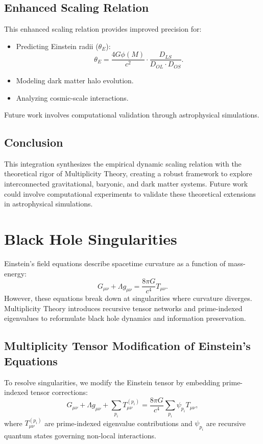 \documentclass[12]{amsart}
\theoremstyle{plain}
\begin{document}
\subsection{Enhanced Scaling Relation}
This enhanced scaling relation provides improved precision for:
\begin{itemize}
    \item Predicting Einstein radii ($\theta_E$):
    \begin{equation}
        \theta_E = \frac{4G \phi(M)}{c^2} \cdot \frac{D_{LS}}{D_{OL} \cdot D_{OS}}.
    \end{equation}
    \item Modeling dark matter halo evolution.
    \item Analyzing cosmic-scale interactions.
\end{itemize}
Future work involves computational validation through astrophysical simulations.

\subsection{Conclusion}
This integration synthesizes the empirical dynamic scaling relation with the theoretical rigor of Multiplicity Theory, creating a robust framework to explore interconnected gravitational, baryonic, and dark matter systems. Future work could involve computational experiments to validate these theoretical extensions in astrophysical simulations.
\section{Black Hole Singularities}
Einstein’s field equations describe spacetime curvature as a function of mass-energy:
\begin{equation}
G_{\mu\nu} + \Lambda g_{\mu\nu} = \frac{8\pi G}{c^4} T_{\mu\nu}.
\end{equation}
However, these equations break down at singularities where curvature diverges. Multiplicity Theory introduces recursive tensor networks and prime-indexed eigenvalues to reformulate black hole dynamics and information preservation.

\subsection{Multiplicity Tensor Modification of Einstein’s Equations}
To resolve singularities, we modify the Einstein tensor by embedding prime-indexed tensor corrections:
\begin{equation}
G_{\mu\nu} + \Lambda g_{\mu\nu} + \sum_{p_i} T_{\mu\nu}^{(p_i)} = \frac{8\pi G}{c^4} \sum_{p_i} \psi_{p_i} T_{\mu\nu},
\end{equation}
where $T_{\mu\nu}^{(p_i)}$ are prime-indexed eigenvalue contributions and $\psi_{p_i}$ are recursive quantum states governing non-local interactions.
\end{document}
